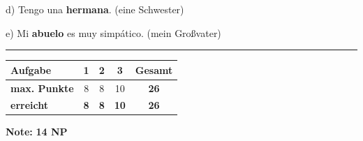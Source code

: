 \documentclass[11pt, a4paper]{article}
\newcommand{\lsg}[1]{\textcolor{loesung}{\textbf{#1}}}
\begin{document}
\vspace{0.8em}

\noindent
d) Tengo una \lsg{hermana}. \hfill (eine Schwester)

\vspace{0.8em}

\noindent
e) Mi \lsg{abuelo} es muy simpático. \hfill (mein Großvater)


\vspace{25pt}
\hrule
\vspace{10pt}

\noindent
\begin{tabularx}{\textwidth}{|X|c|c|c||c|}
\hline
\textbf{Aufgabe} & 1 & 2 & 3 & \textbf{Gesamt} \\
\hline
\textbf{max. Punkte} & 8 & 8 & 10 & \textbf{26} \\
\hline
\textbf{erreicht} & \lsg{8} & \lsg{8} & \lsg{10} & \lsg{26} \\[0.8em]
\hline
\end{tabularx}

\vspace{10pt}

\begin{flushright}
\textbf{Note:} \lsg{14 NP}
\end{flushright}
\end{document}
